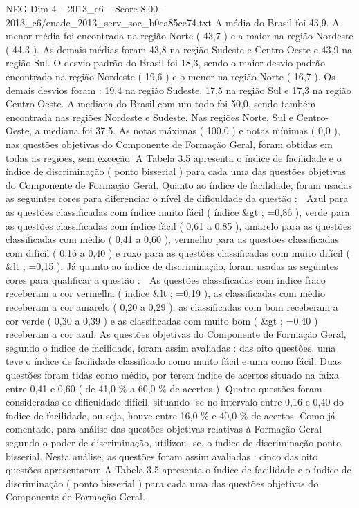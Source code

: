 \begin{textsample}{NEG Dim 4 – 2013\_c6 – Score 8.00 – 2013\_c6/enade\_2013\_serv\_soc\_b0ca85ce74.txt}
A média do Brasil foi 43,9.
A menor média foi encontrada na região Norte ( 43,7 ) e a maior na região Nordeste ( 44,3 ).
As demais médias foram 43,8 na região Sudeste e Centro-Oeste e 43,9 na região Sul.
O desvio padrão do Brasil foi 18,3, sendo o maior desvio padrão encontrado na região Nordeste ( 19,6 ) e o menor na região Norte ( 16,7 ).
Os demais desvios foram : 19,4 na região Sudeste, 17,5 na região Sul e 17,3 na região Centro-Oeste.
A mediana do Brasil com um todo foi 50,0, sendo também encontrada nas regiões Nordeste e Sudeste.
Nas regiões Norte, Sul e Centro-Oeste, a mediana foi 37,5.
As notas máximas ( 100,0 ) e notas mínimas ( 0,0 ), nas questões objetivas do Componente de Formação Geral, foram obtidas em todas as regiões, sem exceção.
A Tabela 3.5 apresenta o índice de facilidade e o índice de discriminação ( ponto bisserial ) para cada uma das questões objetivas do Componente de Formação Geral.
Quanto ao índice de facilidade, foram usadas as seguintes cores para diferenciar o nível de dificuldade da questão :  Azul para as questões classificadas com índice muito fácil ( índice \&gt ; =0,86 ), verde para as questões classificadas com índice fácil ( 0,61 a 0,85 ), amarelo para as questões classificadas com médio ( 0,41 a 0,60 ), vermelho para as questões classificadas com difícil ( 0,16 a 0,40 ) e roxo para as questões classificadas com muito difícil ( \&lt ; =0,15 ).
Já quanto ao índice de discriminação, foram usadas as seguintes cores para qualificar a questão :  As questões classificadas com índice fraco receberam a cor vermelha ( índice \&lt ; =0,19 ), as classificadas com médio receberam a cor amarelo ( 0,20 a 0,29 ), as classificadas com bom receberam a cor verde ( 0,30 a 0,39 ) e as classificadas com muito bom ( \&gt ; =0,40 ) receberam a cor azul.
As questões objetivas do Componente de Formação Geral, segundo o índice de facilidade, foram assim avaliadas : das oito questões, uma teve o índice de facilidade classificado como muito fácil e uma como fácil.
Duas questões foram tidas como médio, por terem índice de acertos situado na faixa entre 0,41 e 0,60 ( de 41,0 \% a 60,0 \% de acertos ).
Quatro questões foram consideradas de dificuldade difícil, situando -se no intervalo entre 0,16 e 0,40 do índice de facilidade, ou seja, houve entre 16,0 \% e 40,0 \% de acertos.
Como já comentado, para análise das questões objetivas relativas à Formação Geral segundo o poder de discriminação, utilizou -se, o índice de discriminação ponto bisserial.
Nesta análise, as questões foram assim avaliadas : cinco das oito questões apresentaram A Tabela 3.5 apresenta o índice de facilidade e o índice de discriminação ( ponto bisserial ) para cada uma das questões objetivas do Componente de Formação Geral.

\end{textsample}

